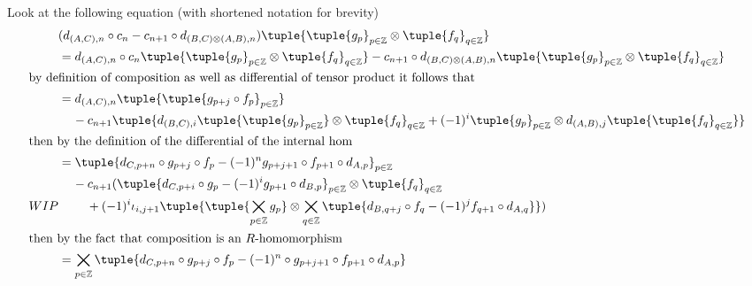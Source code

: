 \begin{remark}
\begin{enumerate}
{            Look at the following equation (with shortened notation for brevity) 
            \begin{align*}
                &( d_{(A, C), n} \circ c_n - c_{n + 1} \circ d_{(B, C) \otimes (A, B), n} )\tuple{ \tuple{ g_p }_{p \in \Zb} \otimes \tuple{ f_q }_{q \in \Zb} } \\
                &= d_{(A, C), n} \circ c_n \tuple{ \tuple{ g_p }_{p \in \Zb} \otimes \tuple{ f_q }_{q \in \Zb} } - c_{n + 1} \circ d_{(B, C) \otimes (A, B), n}\tuple{ \tuple{ g_p }_{p \in \Zb} \otimes \tuple{ f_q }_{q \in \Zb} } \\
                \intertext{by definition of composition as well as differential of tensor product it follows that}
                &= d_{(A, C), n}\tuple{
                    \tuple{ g_{p + j} \circ f_p }_{p \in \Zb}
                } \\
                &\hspace{0.4cm} - c_{n + 1} \tuple{
                    d_{(B, C), i}\tuple{ \tuple{ g_p }_{p \in \Zb} } \otimes \tuple{ f_q }_{q \in \Zb}
                    + (-1)^i \tuple{ g_p }_{p \in \Zb} \otimes d_{(A, B), j} \tuple{ \tuple{ f_q }_{q \in \Zb} }
                } \\
                \intertext{then by the definition of the differential of the internal hom}
                &= \tuple{
                    d_{C, p + n} \circ g_{p + j} \circ f_p - (-1)^n g_{p + j + 1} \circ f_{p + 1} \circ d_{A, p}
                }_{p \in \Zb} \\
                &\hspace{0.4cm} - c_{n + 1} (
                    \tuple{
                        d_{C, p + i} \circ g_p - (-1)^i g_{p + 1} \circ d_{B, p}
                    }_{p \in \Zb} \otimes \tuple{ f_q }_{q \in \Zb} \\
                    WIP&\hspace{0.8cm}+ (-1)^i \iota_{i, j + 1}\tuple{
                        \tuple{ \bigtimes_{p \in \Zb} g_p } \otimes \bigtimes_{q \in \Zb}\tuple{
                            d_{B, q + j} \circ f_q - (-1)^j f_{q + 1} \circ d_{A, q}
                        }
                    }
                ) \\
                \intertext{then by the fact that composition is an \( R \)-homomorphism}
                &= \bigtimes_{p \in \Zb}\tuple{
                    d_{C, p + n} \circ g_{p + j} \circ f_p - (-1)^n \circ g_{p + j + 1} \circ f_{p + 1} \circ d_{A, p}
                } \\

\end{align*}}
\end{enumerate}
\end{remark}
